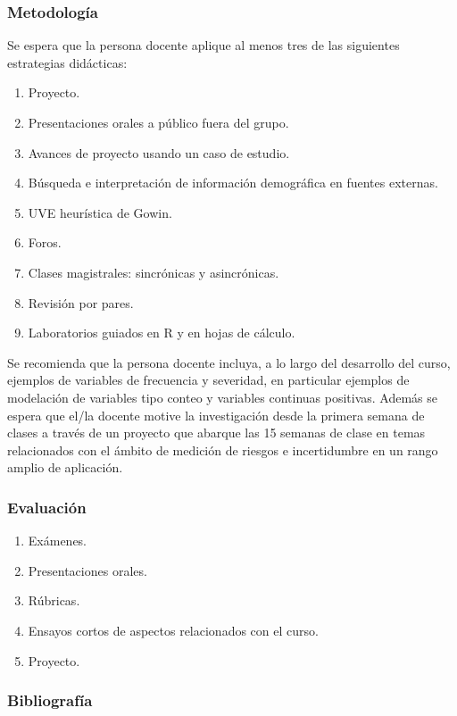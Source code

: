 \begin{refsection}
\subsubsection*{Metodología}

Se espera que la persona docente aplique al menos tres de las siguientes estrategias didácticas:

\begin{enumerate}
\item Proyecto.
\item Presentaciones orales a público fuera del grupo.
\item Avances de proyecto usando un caso de estudio.
\item Búsqueda e interpretación de información demográfica en fuentes externas.
\item UVE heurística de Gowin.
\item Foros.
\item Clases magistrales: sincrónicas y asincrónicas.
\item Revisión por pares.
\item Laboratorios guiados en R y en hojas de cálculo.
\end{enumerate}

Se recomienda que la persona docente incluya, a lo largo del desarrollo del curso, ejemplos de variables de frecuencia y severidad, en particular ejemplos de modelación de variables tipo conteo y variables continuas positivas. Además se espera que el/la docente motive la investigación desde la primera semana de clases a través de un proyecto que abarque las 15 semanas de clase en temas relacionados con el ámbito de medición de riesgos e incertidumbre en un rango amplio de aplicación.

\subsubsection*{Evaluación}

\begin{enumerate}
\item Exámenes.
\item Presentaciones orales.
\item Rúbricas.
\item Ensayos cortos de aspectos relacionados con el curso.
\item Proyecto.
\end{enumerate}

\subsubsection*{Bibliografía}


\end{refsection}
